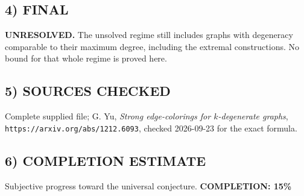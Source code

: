 \subsection*{4) FINAL}
\textbf{UNRESOLVED.} The unsolved regime still includes graphs with degeneracy comparable to their maximum degree, including the extremal constructions. No bound for that whole regime is proved here.
\subsection*{5) SOURCES CHECKED}
Complete supplied file; G. Yu, \emph{Strong edge-colorings for $k$-degenerate graphs}, \texttt{https://arxiv.org/abs/1212.6093}, checked 2026-09-23 for the exact formula.
\subsection*{6) COMPLETION ESTIMATE}
Subjective progress toward the universal conjecture.
\textbf{COMPLETION: 15\%}
